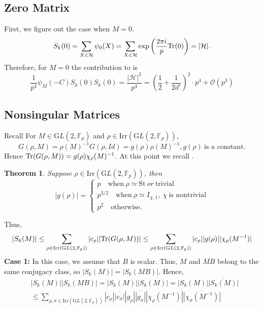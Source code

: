\documentclass[12pt,reqno]{amsart}
\theoremstyle{plain}
\newtheorem{theorem}[thm]{Theorem}
\theoremstyle{definition}
\newcommand{\Tr}{{\rm Tr}}
\newcommand{\GL}{{\mathrm GL}}
\newcommand{\irr}{\mathrm{Irr}}
\newcommand{\sH}{{\mathcal H}}
\newcommand{\sO}{{\mathcal O}}
\theoremstyle{remark}
\newcommand{\FF}{\mathbb{F}}
\begin{document}
\subsection{Zero Matrix}\label{subsec: zero matrix}
First, we figure out the case when $M=0$. 
\begin{align*}
    S_k(0) = \sum _{X \in \sH} \psi_0(X) =  \sum_{X\in \sH}\exp \left( \frac{2 \pi i }{p} \Tr(0) \right)= |\sH|.
\end{align*}
Therefore, for $M=0$ the contribution to  is 
\begin{equation}\label{eq: Main term M=0}
      \frac{1}{p^4} \psi_M(-C) S_k(0) S_k(0) = \frac{|\sH|^2}{p^4} =\left( \frac{1}{2}+\frac{1}{2d'}\right)^2\cdot p^4 + \sO(p^3)
\end{equation}
  
 
\subsection{Nonsingular Matrices}\label{subsec: nonsingular}
Recall  \cite[Section 1.2]{ganguly2023singular} For $M \in \GL(2, \FF_p)$ and $\rho \in \irr(\GL(2, \FF_p))$, 
\begin{equation}
G(\rho, M)= \rho(M)^{-1}G(\rho, Id)= g(\rho)\rho(M)^{-1}, g(\rho) ~\text{is a constant}.
\end{equation}
Hence $\Tr(G(\rho,M))= g(\rho)\chi_\rho(M)^{-1}.$ At this point we recall \cite[Theorem 1.5]{ganguly2023singular}.
\begin{theorem}\label{thm: Kondo's theorem} Suppose $\rho \in \irr(\GL(2, \FF_p))$, then
$$|g(\rho)|= \begin{cases}
    p \quad \text{when}~ \rho \simeq \mathrm{St} ~or~ \text{trivial} \\
    p^{3/2}\quad \text{when}~\rho \simeq I_{{\chi},1}, ~\chi ~\text{is nontrivial}\\
    p^2\quad  \text{otherwise}.
\end{cases}$$
\end{theorem}
Thus,  
$$|S_k(M)| \leq \sum_{\rho\in \irr(\GL(2, \FF_p))}|c_{\rho}||\Tr(G(\rho,M))| \leq \sum_{\rho\in \irr(\GL(2, \FF_p))}|c_{\rho}| |g(\rho)||\chi_\rho(M^{-1})| $$
\textbf{Case 1:} In this case, we assume that $B$ is scalar. Thus, $M$ and $MB$ belong to the same conjugacy class, so $|S_k(M)|= |S_k(MB)|$.
Hence,
\begin{align*}
    &|S_k(M)||S_k(MB)|= |S_k(M)||S_k(M)|=|S_k(M)|\overline{|S_k(M)|}\\
    &\leq  \sum_{\rho, \sigma \in \mathrm{Irr}(\GL(2, \FF_p))}|c_{\rho}|\overline{|c_\sigma|}|g_{\rho}|\overline{|g_\sigma|}|\chi_\rho(M^{-1})|\overline{|\chi_\sigma(M^{-1})|}
\end{align*}
\end{document}

